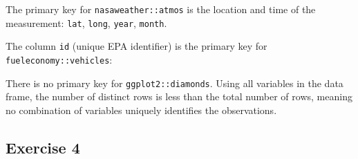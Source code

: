 \documentclass[]{book}
\newenvironment{Shaded}{\begin{snugshade}}{\end{snugshade}}
\newcommand{\CommentTok}[1]{\textcolor[rgb]{0.56,0.35,0.01}{\textit{#1}}}
\newcommand{\DecValTok}[1]{\textcolor[rgb]{0.00,0.00,0.81}{#1}}
\newcommand{\KeywordTok}[1]{\textcolor[rgb]{0.13,0.29,0.53}{\textbf{#1}}}
\newcommand{\NormalTok}[1]{#1}
\newcommand{\OperatorTok}[1]{\textcolor[rgb]{0.81,0.36,0.00}{\textbf{#1}}}
\newcommand{\StringTok}[1]{\textcolor[rgb]{0.31,0.60,0.02}{#1}}
\theoremstyle{definition}
\theoremstyle{definition}
\theoremstyle{definition}
\theoremstyle{remark}
\begin{document}
The primary key for \texttt{nasaweather::atmos} is the location and time
of the measurement: \texttt{lat}, \texttt{long}, \texttt{year},
\texttt{month}.

\begin{Shaded}
\end{Shaded}

The column \texttt{id} (unique EPA identifier) is the primary key for
\texttt{fueleconomy::vehicles}:

\begin{Shaded}
\end{Shaded}

There is no primary key for \texttt{ggplot2::diamonds}. Using all
variables in the data frame, the number of distinct rows is less than
the total number of rows, meaning no combination of variables uniquely
identifies the observations.

\begin{Shaded}
\end{Shaded}

\hypertarget{exercise-4-15}{%
\subsection{Exercise 4}\label{exercise-4-15}}
\end{document}
